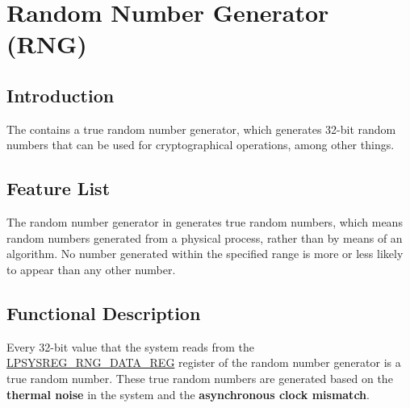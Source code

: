 \documentclass[main\_\_EN.tex]{subfiles}
\begin{document}

\ifglobal
\else
    {\let\clearpage\relax \listoftodos}
    {\let\clearpage\relax \listofdonetodos}
    \tableofcontents
\fi



\hypertarget{rng}{}
\chapter{Random Number Generator (RNG)}
\label{mod:rng}


\section{Introduction}

The \chipname{} contains a true random number generator, which generates 32-bit random numbers that can be used for cryptographical operations, among other things.


\section{Feature List}
\label{sec:rng-features}

The random number generator in \chipname{} generates true random numbers, which means random numbers generated from a physical process, rather than by means of an algorithm. No number generated within the specified range is more or less likely to appear than any other number.


\section{Functional Description}
\label{sec:rng-func-descr}

Every 32-bit value that the system reads from the \hyperref[regdesc:LPSYSREGRNGDATAREG]{LPSYSREG\_RNG\_DATA\_REG} register of the random number generator is a true random number. These true random numbers are generated based on the \textbf{thermal noise} in the system and the \textbf{asynchronous clock mismatch}.
\end{document}
